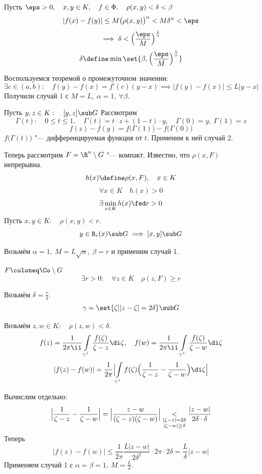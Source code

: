\begin{eproof}
\item Пусть $ \eps > 0, \quad
	x, y \in K, \quad
	f \in \Phi, \quad
	\rho(x, y) < \delta < \beta $
	$$ |f(x) - f(y)| \le M \bigl( \rho(x, y) \bigr)^\alpha <
	M \delta^\alpha < \eps $$
	$$ \implies \delta < \Bigl( \frac\eps M \Bigr)^{\frac1\alpha} $$
	$$ \delta \define \min\set{\beta, \Bigl( \frac\eps M \Bigr)^{\frac1\alpha}} $$
\item Воспользуемся теоремой о промежуточном значении:
	$$ \exists c \in (a, b) : \quad f(y) - f(x) = f'(c)(y - x) \implies
	|f(y) - f(x)| \le L|y - x| $$
	Получили случай 1 с $ M = L, ~ \alpha = 1, ~ \forall \beta $.
\item Пусть $ y, z \in K : \quad [y, z] \sub G $
	Рассмотрим
	$$ \Gamma(t) : \quad
	0 \le t \le 1, \quad
	\Gamma(t) = t \cdot z + (1 - t) \cdot y, \quad
	\Gamma(0) = y, ~ \Gamma(1) = z $$
	$$ f(z) - f(y) = f \bigl( \Gamma(1) \bigr) - f \bigl( \Gamma(0) \bigr) $$
	$ f \bigl( \Gamma(t) \bigr) $ "--- дифференцируемая функция от $ t $.
	Применим к ней случай 2.

	Теперь рассмотрим $ F = \R^n \setminus G $ "--- компакт.
	Известно, что $ \rho(x, F) $ непрерывна.
	$$ h(x) \define \rho(x, F), \quad x \in K $$
	$$ \forall x \in K \quad h(x) > 0 $$
	$$ \exists \min\limits_{x \in K} h(x) \fed r > 0 $$
	Пусть $ x, y \in K : \quad \rho(x, y) < r $.
	$$ y \in \mathtt B_r(x) \sub G \implies [x, y] \sub G $$

	Возьмём $ \alpha = 1, ~ M = L\sqrt{n}, ~ \beta = r $ и применим случай 1.
\item $ F \coloneq \Co \setminus G $
	$$ \exists r > 0 : \quad \forall z \in K \quad \rho(z, F) \ge r $$

	Возьмём $ \delta = \frac r3 $.
	$$ \gamma = \set{\zeta | {} |z - \zeta| = 2\delta} \sub G $$

	Возьмём $ z, w \in K : \quad \rho(z, w) < \delta $.
	$$ f(z) = \frac1{2\pi \ii} \int\limits_{\gamma^+} \frac{f(\zeta)}{\zeta - z}\di \zeta, \quad
	f(w) = \frac1{2\pi \ii} \int\limits_{\gamma^+} \frac{f(\zeta)}{\zeta - w}\di \zeta $$
	$$ |f(z) - f(w)| = \frac1{2\pi} \Bigl| \int\limits_{\gamma^+} f(\zeta) \Bigl( \frac1{\zeta - z} - \frac1{\zeta - w} \Bigr)\di \zeta \Bigr| $$

	Вычислим отдельно:
	$$ \Bigl| \frac1{\zeta - z} - \frac1{\zeta - w} \Bigr| =
	\Bigl| \frac{z - w}{(\zeta - z)(\zeta - w)} \Bigr| \underset{
		\begin{subarray}{c}
			|\zeta - z| = 2\delta \\
			|\zeta - w| \ge \delta
		\end{subarray}}<
	\frac{|z - w|}{2 \delta \cdot \delta} $$
	Теперь
	$$ |f(z) - f(w)| \le \frac1{2\pi} \frac{L |z - w|}{2 \delta^2} \cdot 2\pi \cdot 2\delta =
	\frac L \delta |z - w| $$
	Применяем случай 1 с $ \alpha = \beta = 1, ~ M = \frac L \delta $.
\end{eproof}
